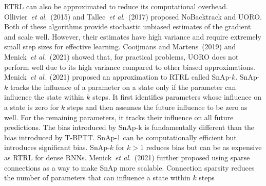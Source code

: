 \documentclass[twoside,11pt]{article}
\newcommand{\etal}{\textit{et al}.}
\begin{document}
RTRL can also be approximated to reduce its computational overhead. Ollivier~\etal~(2015) and Tallec~\etal~(2017) proposed NoBacktrack and UORO. Both of these algorithms provide stochastic unbiased estimates of the gradient and scale well. However, their estimates have high variance and require extremely small step sizes for effective learning. Cooijmans and Martens~(2019) and Menick~\etal~(2021) showed that, for practical problems, UORO does not perform well due to its high variance compared to other biased approximations. Menick~\etal~(2021) proposed an approximation to RTRL called SnAp-$k$. SnAp-$k$ tracks the influence of a parameter on a state only if the parameter can influence the state within $k$ steps. It first identifies parameters whose influence on a state is zero for $k$ steps and then assumes the future influence to be zero as well. For the remaining parameters, it tracks their influence on all future predictions. The bias introduced by SnAp-k is fundamentally different than the bias introduced by T-BPTT. SnAp-1 can be computationally efficient but introduces significant bias. SnAp-$k$ for $k>1$ reduces bias but can be as expensive as RTRL for dense RNNs.  Menick~\etal~(2021) further proposed using sparse connections as a way to make SnAp more scalable. Connection sparsity reduces the number of parameters that can influence a state within $k$ steps

\end{document}
